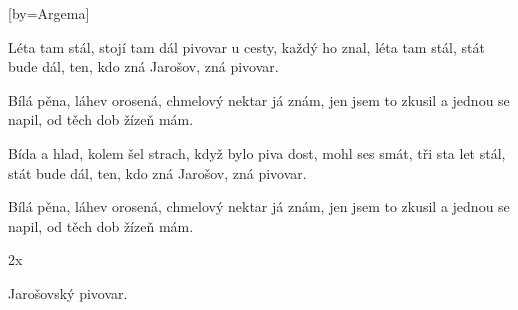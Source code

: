 [by={Argema}]

\beginverse{}
Léta tam stál, stojí tam dál
pivovar u cesty, každý ho znal,
léta tam stál, stát bude dál,
ten, kdo zná Jarošov, zná pivovar. 
\endverse{}

\beginchorus{}
Bílá pěna, láhev orosená,
chmelový nektar já znám,
jen jsem to zkusil a jednou se napil,
od těch dob žízeň mám. 
\endchorus{}

\beginverse{}
Bída a hlad, kolem šel strach,
když bylo piva dost, mohl ses smát,
tři sta let stál, stát bude dál,
ten, kdo zná Jarošov, zná pivovar. 
\endverse{}

\beginchorus{}
Bílá pěna, láhev orosená,
chmelový nektar já znám,
jen jsem to zkusil a jednou se napil,
od těch dob žízeň mám.
\endchorus{}

\beginchorus{}
2x
\endchorus{}

\beginverse{}
Jarošovský pivovar.
\endverse{}

\endsong{}
